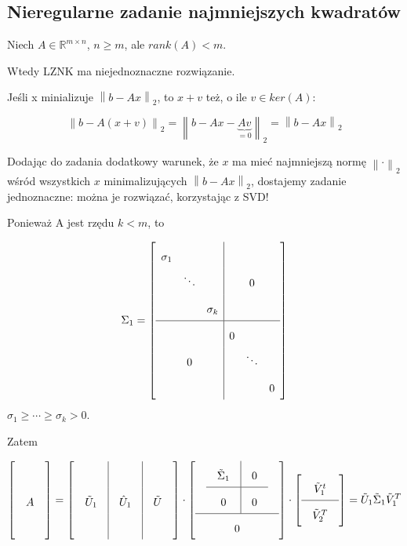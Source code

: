 \documentclass[hidelinks,a4paper,fleqn]{article}
\newcommand{\RR}{\mathbb{R}}
\newcommand{\norm}[1]{\left\lVert#1\right\rVert}
\begin{document}
\subsection{Nieregularne zadanie najmniejszych kwadratów}

Niech $A \in \RR^{m \times n}$, $n \geq m$, ale $rank(A) < m$.

Wtedy LZNK ma niejednoznaczne rozwiązanie.

Jeśli x minializuje $\norm{b - Ax}_2$, to $x+v$ też, o ile $v \in ker(A)$:

\[
	\norm{b - A(x + v)}_2 = \norm{b - Ax - \underbrace{Av}_{=0}}_2 = \norm{b - Ax}_2
\]

Dodając do zadania dodatkowy warunek, że $x$ ma mieć najmniejszą normę $\norm{\cdot}_2$ wśród wszystkich $x$ minimalizujących $\norm{b - Ax}_2$, dostajemy zadanie jednoznaczne: można je rozwiązać, korzystając z SVD!

Ponieważ A jest rzędu $k<m$, to 

\[
	\Sigma_1 = \left[ \begin{array}{ccc|ccc}
		\sigma_1 &  &  &  &  & \\ 
		&  \ddots &  &  & 0  & \\ 
		&  & \sigma_k  &  &  & \\ 
		\hline
		&  & &  0 &  & \\ 
		&  0 &  &  & \ddots & \\ 
		&  &  &  &  & 0
	\end{array} \right]
\]
$\sigma_1 \geq \cdots \geq \sigma_k > 0$.

Zatem

\[\arraycolsep=1em\def\arraystretch{2}
	\left[\begin{array}{c} \\ A \\ \ \end{array}\right] =
	\left[\begin{array}{c|c|c} & &\ \\ \tilde{U}_1 & \hat{U}_1 & \tilde{U} \\ & & \ \end{array}\right] \cdot \left[ \begin{array}{c} \begin{array}{c|c} \tilde{\Sigma}_1 & 0 \\ \hline 0 & 0 \end{array} \\ \hline 0\end{array}\right] \cdot \left[ \begin{array}{c} \tilde{V}_1^t \\ \hline \tilde{V}_2^T \end{array}\right] = \tilde{U}_1 \tilde{\Sigma}_1 \tilde{V}_1^T
\]
\end{document}

